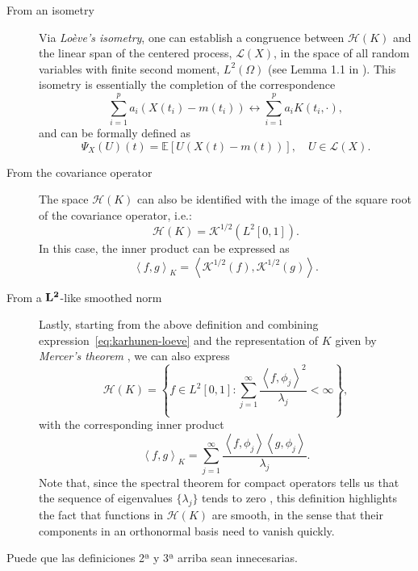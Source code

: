 \documentclass[ba]{imsart}
\numberwithin{equation}{section}
\theoremstyle{plain}
\newcommand{\E}{\mathbb{E}}
\newcommand\dotprod[2]{\left\langle #1, #2 \right\rangle}
\newenvironment{comment}
{
\noindent \em \color{red}
}
{
\color{black}
}
\begin{document}
\begin{description}
  \item[From an isometry] Via \textit{Loève's isometry}, one can establish a congruence between \(\mathcal H(K)\) and the linear span of the centered process, \(\mathcal L(X)\), in the space of all random variables with finite second moment, \(L^2(\Omega)\) (see Lemma 1.1 in \citet{lukic2001stochastic}). This isometry is essentially the completion of the correspondence
  \[
  \sum_{i=1}^p a_i (X(t_i) - m(t_i)) \longleftrightarrow \sum_{i=1}^p a_i K(t_i, \cdot),
\]
and can be formally defined as
\begin{equation}\label{eq:loeves-isometry}
  \Psi_X(U)(t) = \E[U(X(t) - m(t))], \quad U \in \mathcal L(X).
\end{equation}
  \item[From the covariance operator] The space \(\mathcal H(K)\) can also be identified with the image of the square root of the covariance operator, i.e.:
  \begin{equation}\label{eq:rkhs-square-root}
  \mathcal H(K) = \mathcal K^{1/2}(L^2[0, 1]).
\end{equation}
In this case, the inner product can be expressed as
\[
\dotprod{f}{g}_K = \dotprod{\mathcal K^{1/2}(f)}{\mathcal K^{1/2}(g)}.
\]

  \item[From a \(\bf L^2\)-like smoothed norm] Lastly, starting from the above definition and combining expression~\eqref{eq:karhunen-loeve} and the representation of \(K\) given by \textit{Mercer's theorem} \citep{mercer1909functions}, we can also express
  \begin{equation}\label{rkhs-sum-lambda}
    \mathcal H(K) = \left\{f \in L^2[0, 1]: \sum_{j=1}^\infty \frac{\dotprod{f}{\phi_j}^2}{\lambda_j} < \infty \right\},
  \end{equation}
  with the corresponding inner product
  \[
  \dotprod{f}{g}_K = \sum_{j=1}^\infty \frac{\dotprod{f}
  {\phi_j}\dotprod{g}{\phi_j}}{\lambda_j}.
  \]
Note that, since the spectral theorem for compact operators tells us that the sequence of eigenvalues \(\{\lambda_j\}\) tends to zero \citep[e.g.][Th.~4.2.4]{hsing2015theoretical}, this definition highlights the fact that functions in \(\mathcal H(K)\) are smooth, in the sense that their components in an orthonormal basis need to vanish quickly.
\end{description}

\begin{comment}
  Puede que las definiciones 2ª y 3ª arriba sean innecesarias.
\end{comment}
\end{document}
